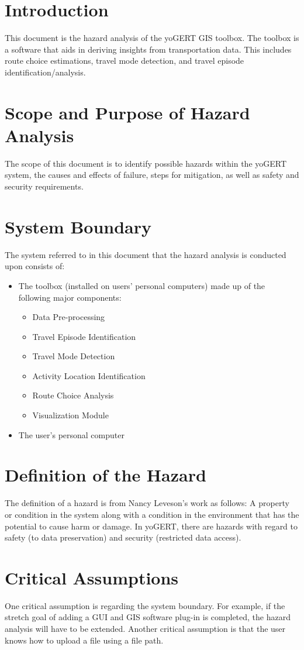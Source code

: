 \documentclass{article}
\begin{document}
\section{Introduction}
This document is the hazard analysis of the yoGERT GIS toolbox. The toolbox is a software that aids in deriving insights from transportation data. This includes route choice estimations, travel mode detection, and travel episode identification/analysis.
\section{Scope and Purpose of Hazard Analysis}
The scope of this document is to identify possible hazards within the yoGERT system, the causes and effects of failure, steps for mitigation, as well as safety and security requirements.
\section{System Boundary}
The system referred to in this document that the hazard analysis is conducted upon consists of:
\begin{itemize}
    \item The toolbox (installed on users' personal computers) made up of the following major components:
    \begin{itemize}
        \item Data Pre-processing
        \item Travel Episode Identification
        \item Travel Mode Detection
        \item Activity Location Identification
        \item Route Choice Analysis
        \item Visualization Module
    \end{itemize}
    \item The user's personal computer
    
\end{itemize}
\section{Definition of the Hazard}
The definition of a hazard is from Nancy Leveson's work as follows: A property or condition in the system along with a condition in the environment that has the potential to cause harm or damage. In yoGERT, there are hazards with regard to safety (to data preservation) and security (restricted data access).
\section{Critical Assumptions}
One critical assumption is regarding the system boundary. For example, if the stretch goal of adding a GUI and GIS software plug-in is completed, the hazard analysis will have to be extended. Another critical assumption is that the user knows how to upload a file using a file path. \\
\end{document}
